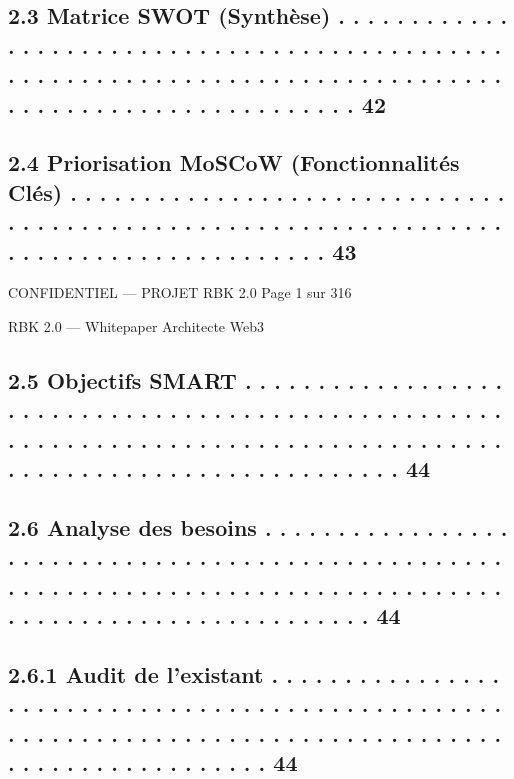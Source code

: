 \documentclass[12pt,landscape,a4paper]{article}
\newenvironment{confidential}
{\begin{tcolorbox}[
    colback=rbkred!5!white,
    colframe=rbkred!75!black,
    title=CONFIDENTIEL,
    fonttitle=\bfseries\color{white},
    coltitle=rbkred!75!black,
    breakable,
    enhanced,
    frame hidden,
    borderline west={2pt}{0pt}{rbkred!75!black}
]}
{\end{tcolorbox}}
\begin{document}
\subsection{2.3     Matrice SWOT (Synthèse) . . . . . . . . . . . . . . . . . . . . . . . . . . . . . . . . . . . . . . . . . . . . . . . . . . . . . . . . . . . . . . . . . . . . . . . . . . . . . . . . . . . . . . . . . . . . . . . . . . . . . . . . 42}
\subsection{2.4     Priorisation MoSCoW (Fonctionnalités Clés) . . . . . . . . . . . . . . . . . . . . . . . . . . . . . . . . . . . . . . . . . . . . . . . . . . . . . . . . . . . . . . . . . . . . . . . . . . . . . . . . . . . . . . 43}
\vspace{0.5em}
\vspace{0.5em}
\vspace{0.5em}
\vspace{0.5em}
\begin{confidential}CONFIDENTIEL — PROJET RBK 2.0                                                                              Page 1 sur 316\end{confidential}
RBK 2.0 — Whitepaper Architecte Web3\\
\vspace{0.5em}
\vspace{0.5em}
\subsection{2.5     Objectifs SMART . . . . . . . . . . . . . . . . . . . . . . . . . . . . . . . . . . . . . . . . . . . . . . . . . . . . . . . . . . . . . . . . . . . . . . . . . . . . . . . . . . . . . . . . . . . . . . . . . . . . . . . . . . . . . . . . . 44}
\subsection{2.6     Analyse des besoins . . . . . . . . . . . . . . . . . . . . . . . . . . . . . . . . . . . . . . . . . . . . . . . . . . . . . . . . . . . . . . . . . . . . . . . . . . . . . . . . . . . . . . . . . . . . . . . . . . . . . . . . . . . . . . 44}
\subsection{2.6.1               Audit de l’existant . . . . . . . . . . . . . . . . . . . . . . . . . . . . . . . . . . . . . . . . . . . . . . . . . . . . . . . . . . . . . . . . . . . . . . . . . . . . . . . . . . . . . . . . . . . . . . . . . . . . . . 44}
\end{document}
